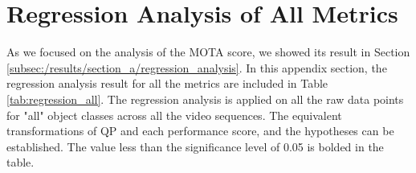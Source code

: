 \section{Regression Analysis of All Metrics}
\label{sec:appendix/section_regression_all}
As we focused on the analysis of the MOTA score, we showed its result in Section \ref{subsec:/results/section_a/regression_analysis}. In this appendix section, the regression analysis result for all the metrics are included in Table \ref{tab:regression_all}. The regression analysis is applied on all the raw data points for "all" object classes across all the video sequences. The equivalent transformations of QP and each performance score, and the hypotheses can be established. The value less than the significance level of 0.05 is bolded in the table.




